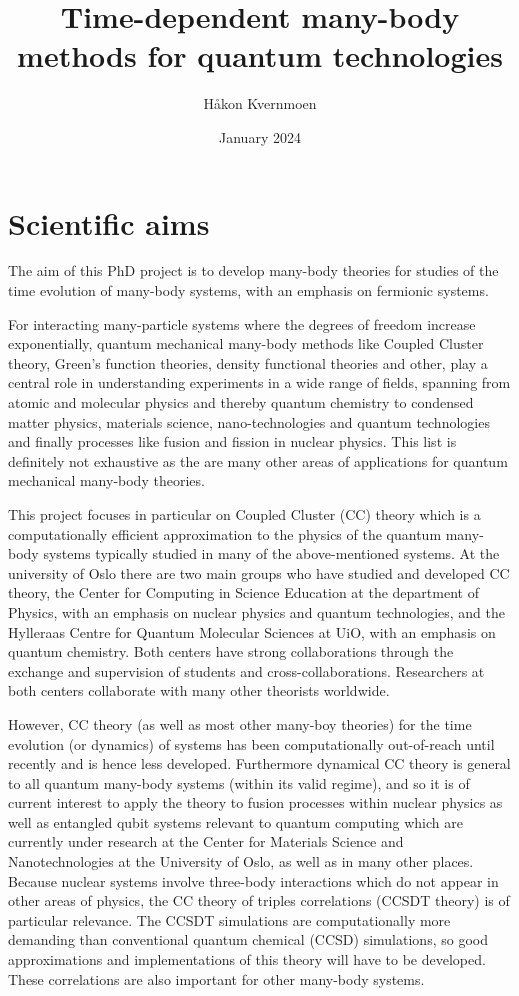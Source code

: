 \documentclass{article}
\title{Time-dependent many-body methods for quantum technologies}
\author{H\aa kon Kvernmoen}
\date{January 2024}
\begin{document}
\maketitle  

\section{Scientific aims}


The aim of this PhD project is to develop many-body theories for
studies of the time evolution of many-body systems, with an emphasis
on fermionic systems.


For interacting many-particle systems
where the degrees of freedom increase exponentially, quantum
mechanical many-body methods like Coupled Cluster theory, Green's
function theories, density functional theories and other, play a
central role in understanding experiments in a wide range of fields,
spanning from atomic and molecular physics and thereby quantum chemistry to
condensed matter physics, materials science, nano-technologies and
quantum technologies and finally processes like fusion and fission in
nuclear physics. This list is definitely not exhaustive as the are many other
areas of applications for quantum mechanical many-body theories.

This project focuses in particular on Coupled Cluster (CC) theory
which is a computationally efficient approximation to the physics of
the quantum many-body systems typically studied in many of the
above-mentioned systems.  At the university of Oslo there are two main
groups who have studied and developed CC theory, the Center for
Computing in Science Education at the department of Physics, with an
emphasis on nuclear physics and quantum technologies, and the
Hylleraas Centre for Quantum Molecular Sciences at UiO, with an
emphasis on quantum chemistry. Both centers have strong collaborations
through the exchange and supervision of students and cross-collaborations.
Researchers at both centers collaborate with many other theorists
worldwide.

However, CC theory (as well as most other many-boy theories) for the
time evolution (or dynamics) of systems has been computationally
out-of-reach until recently and is hence less developed. Furthermore
dynamical CC theory is general to all quantum many-body systems
(within its valid regime), and so it is of current interest to apply
the theory to fusion processes within nuclear physics as well as
entangled qubit systems relevant to quantum computing which are
currently under research at the Center for Materials Science and
Nanotechnologies at the University of Oslo, as well as in many other
places.  Because nuclear systems involve three-body interactions which
do not appear in other areas of physics, the CC theory of triples
correlations (CCSDT theory) is of particular relevance. The CCSDT
simulations are computationally more demanding than conventional
quantum chemical (CCSD) simulations, so good approximations and
implementations of this theory will have to be developed. These
correlations are also important for other many-body systems.
\end{document}
